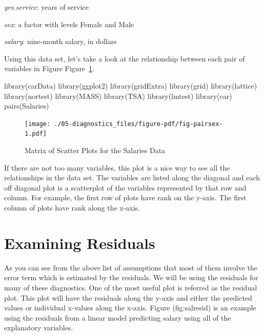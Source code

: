 \documentclass[
  letterpaper,
  DIV=11,
  numbers=noendperiod]{scrreprt}
\newenvironment{Shaded}{\begin{snugshade}}{\end{snugshade}}
\newcommand{\FunctionTok}[1]{\textcolor[rgb]{0.28,0.35,0.67}{#1}}
\newcommand{\NormalTok}[1]{\textcolor[rgb]{0.00,0.23,0.31}{#1}}
\begin{document}
\emph{yrs.service}: years of service

\emph{sex}: a factor with levels Female and Male

\emph{salary}: nine-month salary, in dollars

Using this data set, let's take a look at the relationship between each
pair of variables in Figure Figure~\ref{fig-pairsex}.

\begin{Shaded}
\begin{Highlighting}[]
\FunctionTok{library}\NormalTok{(carData)}
\FunctionTok{library}\NormalTok{(ggplot2)}
\FunctionTok{library}\NormalTok{(gridExtra)}
\FunctionTok{library}\NormalTok{(grid)}
\FunctionTok{library}\NormalTok{(lattice)}
\FunctionTok{library}\NormalTok{(nortest)}
\FunctionTok{library}\NormalTok{(MASS)}
\FunctionTok{library}\NormalTok{(TSA)}
\FunctionTok{library}\NormalTok{(lmtest)}
\FunctionTok{library}\NormalTok{(car)}
\FunctionTok{pairs}\NormalTok{(Salaries)}
\end{Highlighting}
\end{Shaded}

\begin{figure}[H]

{\centering \texttt{[image: ./05-diagnostics\_files/figure-pdf/fig-pairsex-1.pdf]}

}

\caption{\label{fig-pairsex}Matrix of Scatter Plots for the Salaries
Data}

\end{figure}

If there are not too many variables, this plot is a nice way to see all
the relationships in the data set. The variables are listed along the
diagonal and each off diagonal plot is a scatterplot of the variables
represented by that row and column. For example, the first row of plots
have rank on the y-axis. The first column of plots have rank along the
x-axis.

\hypertarget{examining-residuals}{%
\section{Examining Residuals}\label{examining-residuals}}

As you can see from the above list of assumptions that most of them
involve the error term which is estimated by the residuals. We will be
using the residuals for many of these diagnostics. One of the most
useful plot is referred as the residual plot. This plot will have the
residuals along the y-axis and either the predicted values or individual
x-values along the x-axis. Figure (fig:salresid) is an example
using the residuals from a linear model predicting salary using all of
the explanatory variables.
\end{document}
